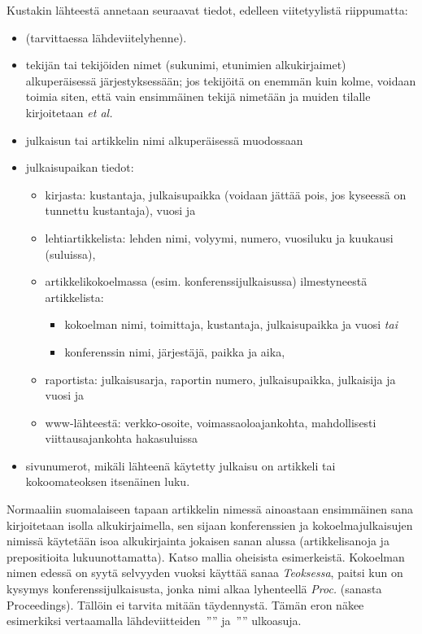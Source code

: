 \documentclass[finnish,gradu]{tktltiki}
\begin{document}
Kustakin lähteestä annetaan seuraavat tiedot, edelleen viitetyylistä riippumatta:
\begin{itemize}
\item (tarvittaessa lähdeviitelyhenne).
\item
tekijän tai tekijöiden nimet (sukunimi, etunimien alkukirjaimet)
alkuperäisessä järjestyksessään; jos tekijöitä on enemmän kuin kolme,
voidaan toimia siten, että
vain ensimmäinen tekijä nimetään ja muiden tilalle kirjoitetaan {\em et
al.}
\item
julkaisun tai artikkelin nimi alkuperäisessä muodossaan
\item
julkaisupaikan tiedot:
\begin{itemize}
\item
kirjasta: kustantaja, julkaisupaikka (voidaan jättää pois, jos kyseessä
on tunnettu kustantaja), vuosi ja
\item
lehtiartikkelista: lehden nimi, volyymi, numero, vuosiluku ja kuukausi (suluissa),

\item
artikkelikokoelmassa (esim. konferenssijulkaisussa) ilmestyneestä
artikkelista:
\begin{itemize}
\item kokoelman nimi, toimittaja, kustantaja, julkaisupaikka ja vuosi
{\em tai}
\item konferenssin nimi, järjestäjä, paikka ja aika,
\end{itemize}
\item
raportista: julkaisusarja, raportin numero, julkaisupaikka, julkaisija ja vuosi
ja
\item
www-lähteestä: verkko-osoite, voimassaoloajankohta, mahdollisesti
viittausajankohta hakasuluissa
\end{itemize}
\item
sivunumerot, mikäli lähteenä käytetty julkaisu on artikkeli tai kokoomateoksen itsenäinen luku.
\end{itemize}

Normaaliin suomalaiseen tapaan artikkelin nimessä ainoastaan
ensimmäinen sana kirjoitetaan isolla alkukirjaimella, sen sijaan
konferenssien ja kokoelmajulkaisujen nimissä käytetään isoa
alkukirjainta jokaisen sanan alussa (artikkelisanoja ja prepositioita
lukuunottamatta). Katso mallia oheisista esimerkeistä.
Kokoelman nimen edessä on syytä selvyyden vuoksi käyttää sanaa {\em
Teoksessa}, paitsi kun on kysymys konferenssijulkaisusta, jonka nimi
alkaa lyhenteellä {\em Proc.} (sanasta Proceedings). Tällöin ei tarvita
mitään täydennystä.
Tämän eron näkee esimerkiksi vertaamalla
lähdeviitteiden~''\cite{dantowsley90}''
ja~''\cite{gannonetal89}'' ulkoasuja.
\end{document}
